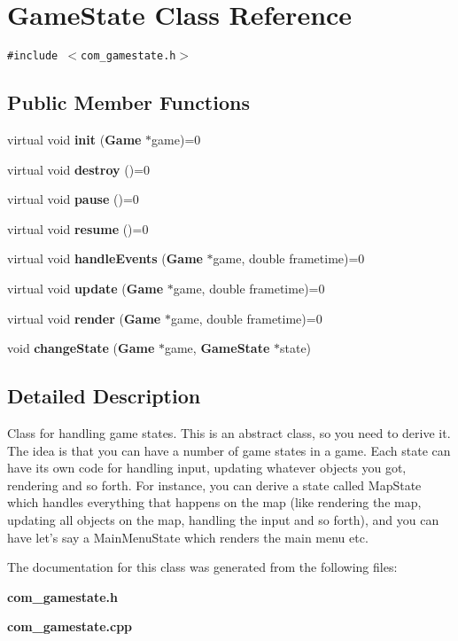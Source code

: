 \section{GameState Class Reference}
\label{classEngine_1_1GameState}
{\tt \#include $<$com\_\-gamestate.h$>$}

\subsection*{Public Member Functions}
\begin{CompactItemize}
\item 
virtual void \textbf{init} ({\bf Game} $\ast$game)=0\label{classEngine_1_1GameState_a036a0c79b1db54def5461a0f60528bb}

\item 
virtual void \textbf{destroy} ()=0\label{classEngine_1_1GameState_f79997318d96497d77015571261ec88b}

\item 
virtual void \textbf{pause} ()=0\label{classEngine_1_1GameState_146b9e6f9c2d9d5b18e7221a38dbf103}

\item 
virtual void \textbf{resume} ()=0\label{classEngine_1_1GameState_6596cf9cc8befb8bce505a0cc4228180}

\item 
virtual void \textbf{handleEvents} ({\bf Game} $\ast$game, double frametime)=0\label{classEngine_1_1GameState_4ac63419f0fdb380705be8f0b0d161b0}

\item 
virtual void \textbf{update} ({\bf Game} $\ast$game, double frametime)=0\label{classEngine_1_1GameState_e58cbdefe113e3ee18aa12b7c00a507b}

\item 
virtual void \textbf{render} ({\bf Game} $\ast$game, double frametime)=0\label{classEngine_1_1GameState_8f408c95c78294e315d92de833e81d09}

\item 
void \textbf{changeState} ({\bf Game} $\ast$game, {\bf GameState} $\ast$state)\label{classEngine_1_1GameState_f863ae3110f6a19d9df14819aae3fffd}

\end{CompactItemize}


\subsection{Detailed Description}
Class for handling game states. This is an abstract class, so you need to derive it. The idea is that you can have a number of game states in a game. Each state can have its own code for handling input, updating whatever objects you got, rendering and so forth. For instance, you can derive a state called MapState which handles everything that happens on the map (like rendering the map, updating all objects on the map, handling the input and so forth), and you can have let's say a MainMenuState which renders the main menu etc. 

The documentation for this class was generated from the following files:\begin{CompactItemize}
\item 
{\bf com\_\-gamestate.h}\item 
{\bf com\_\-gamestate.cpp}\end{CompactItemize}

